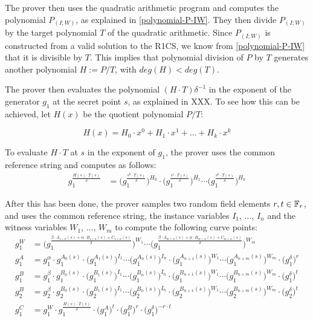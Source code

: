 The prover then uses the quadratic arithmetic program and computes the polynomial $P_{(I;W)}$, as explained in \ref{polynomial-P-IW}. They then divide $P_{(I;W)}$ by the target polynomial $T$ of the quadratic arithmetic. Since $P_{(I;W)}$ is constructed from a valid solution to the R1CS, we know from \ref{polynomial-P-IW} that it is divisible by $T$. This implies that polynomial division of $P$ by $T$ generates another polynomial $H:= P / T$, with $deg(H)<deg(T)$. 

The prover then evaluates the polynomial $(H\cdot T)\delta^{-1}$ in the exponent of the generator $g_1$ at the secret point $s$, as explained in XXX. To see how this can be achieved, let $H(x)$ be the quotient polynomial $P/T$:

\begin{equation}
H(x) = H_0\cdot x^0 + H_1\cdot x^1 +\ldots + H_k \cdot x^k
\end{equation}

To evaluate $H\cdot T$ at $s$ in the exponent of $g_1$, the prover uses the common reference string and computes as follows:
\begin{align*}
g_1^{\frac{H(s)\cdot T(s)}{\delta}} 
 &= \Big(g_1^{\frac{s^0\cdot T(s)}{\delta}}\Big)^{H_0}\cdot \Big(g_1^{\frac{s^1\cdot T(s)}{\delta}}\Big)^{H_1}\cdots \Big(g_1^{\frac{s^k\cdot T(s)}{\delta}}\Big)^{H_k}
\end{align*}

After this has been done, the prover samples two random field elements $r,t\in \mathbb{F}_r$, and uses the common reference string, the instance variables $I_1$, $\ldots$, $I_n$ and the witness variables $W_1$, $\ldots$, $W_m$ to compute the following curve points:
\begin{align*}
g_1^W & = \Big( g_1^{\frac{\beta\cdot A_{1+n}(s)+\alpha\cdot B_{1+n}(s)+C_{1+n}(s)}{\delta}}\Big)^{W_1}\cdots \Big(g_1^{\frac{\beta\cdot A_{m+n}(s)+\alpha\cdot B_{m+n}(s)+C_{m+n}(s)}{\delta}}\Big)^{W_m}\\
g_1^A & = g_1^\alpha \cdot g_1^{A_0(s)} \cdot \Big(g_1^{A_1(s)}\Big)^{I_1}\cdots \Big(g_1^{A_n(s)}\Big)^{I_n} \cdot \Big(g_1^{A_{n+1}(s)}\Big)^{W_1}\cdots \Big(g_1^{A_{n+m}(s)}\Big)^{W_m} \cdot \Big(g_1^\delta\Big)^r \\
g_1^B & = g_1^\beta \cdot g_1^{B_0(s)} \cdot \Big(g_1^{B_1(s)}\Big)^{I_1}\cdots \Big(g_1^{B_n(s)}\Big)^{I_n} \cdot \Big(g_1^{B_{n+1}(s)}\Big)^{W_1}\cdots \Big(g_1^{B_{n+m}(s)}\Big)^{W_m} \cdot \Big(g_1^\delta\Big)^t\\
g_2^B & = g_2^\beta \cdot g_2^{B_0(s)} \cdot \Big(g_2^{B_1(s)}\Big)^{I_1}\cdots \Big(g_2^{B_n(s)}\Big)^{I_n} \cdot \Big(g_2^{B_{n+1}(s)}\Big)^{W_1}\cdots \Big(g_2^{B_{n+m}(s)}\Big)^{W_m} \cdot \Big(g_2^\delta\Big)^t \\
g_1^C & = g_1^W\cdot g_1^{\frac{H(s)\cdot T(s)}{\delta}} \cdot \Big(g_1^A\Big)^t \cdot \Big(g_1^B\Big)^r \cdot \Big(g_1^\delta\Big)^{-r\cdot t}
\end{align*}

